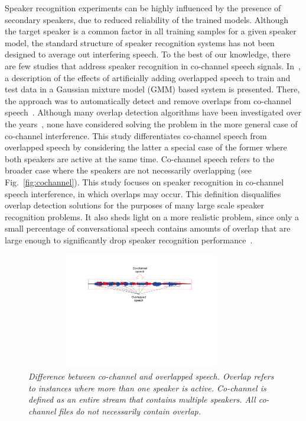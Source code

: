 \documentclass[journal]{IEEEtran}
\begin{document}
Speaker recognition experiments can be highly influenced by the presence of secondary speakers, due to reduced reliability of the trained models. 
Although the target speaker is a common factor in all training samples for a given speaker model, the standard structure of speaker recognition systems has not been designed to average out interfering speech. 
To the best of our knowledge, there are few studies that address speaker recognition in co-channel speech signals. 
In~\cite{yantorno_report,yantorno_SID}, a description of the effects of artificially adding overlapped speech to train and test data in a Gaussian mixture model (GMM) based system is presented. 
There, the approach was to automatically detect and remove overlaps from co-channel speech~\cite{yantorno_SID}. 
Although many overlap detection algorithms have been investigated over the years~\cite{Boakye_icassp_08,nav_icassp13,smolenski_tut,sapvr_2000}, none have considered solving the problem in the more general case of co-channel interference. 
This study differentiates co-channel speech from overlapped speech by considering the latter a special case of the former where both speakers are active at the same time. 
Co-channel speech refers to the broader case where the speakers are not necessarily overlapping (see Fig.~\ref{fig:cochannel}). 
This study focuses on speaker recognition in co-channel speech interference, in which overlaps may occur.  
This definition disqualifies overlap detection solutions for the purposes of many large scale speaker recognition problems. 
It also sheds light on a more realistic problem, since only a small percentage of conversational speech contains amounts of overlap that are large enough to significantly drop speaker recognition performance~\cite{cetin_shriberg_06_icassp,smolenski_tut}. 

\begin{figure}[t!]
	\centering
	\vspace{0mm}
	\includegraphics[height = 2in, width=0.9\textwidth]{figures/cochannel_vs_overlap-crop}
	\vspace{-3mm}
	\caption{\it \small Difference between co-channel and overlapped speech. Overlap refers to instances where more than one speaker is active. Co-channel is defined as an entire stream that contains multiple speakers. All co-channel files do not necessarily contain overlap. }
	\label{fig:cochannel_vs_overlap}
	\vspace{-3mm}
\end{figure}
\end{document}
